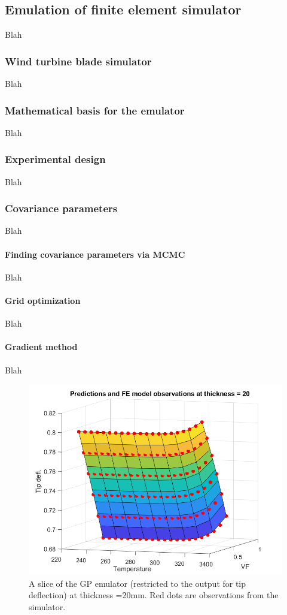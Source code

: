 \documentclass{article}
\begin{document}
\subsection{Emulation of finite element simulator}
Blah

\subsubsection{Wind turbine blade simulator}
Blah

\subsubsection{Mathematical basis for the emulator}
Blah

\subsubsection{Experimental design}
Blah

\subsubsection{Covariance parameters}
Blah

\paragraph{Finding covariance parameters via MCMC}
Blah

\paragraph{Grid optimization}
Blah

\paragraph{Gradient method}
Blah

\begin{figure}
\centering
\includegraphics[width=.65\linewidth]{emulator_surface}
\caption{A slice of the GP emulator (restricted to the output for tip deflection) at thickness =20mm. Red dots are observations from the simulator.}
\label{fig:emulator_surface}
\end{figure}
\end{document}
